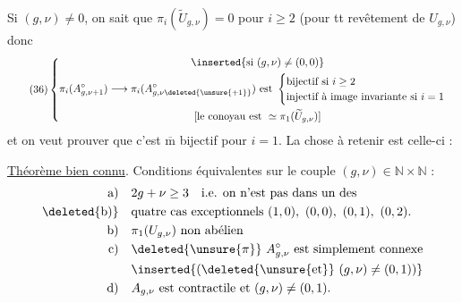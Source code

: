Si $(g,\nu)\ne0$, on sait que $\pi_i(\widetilde U_{g,\nu})=0$ pour $i\geq2$ (pour tt revêtement de $U_{g,\nu}$) donc
\[
\tag{36}
\left\{\begin{gathered}
\inserted{\text{si }(g,\nu)\ne(0,0)}\\
\pi_i(A_{g,\nu+1}^{\circ})\longrightarrow\pi_i(A_{g,\nu\deleted{\unsure{+1}}}^{\circ})
\text{ est }\begin{cases}
\text{bijectif si }i\geq2\\
\text{injectif à image invariante si }i=1
\end{cases}\\
\text{[le conoyau est }\simeq\pi_1(\widetilde U_{g,\nu})\text{]}
\end{gathered}\right.
\]
et on veut prouver que c'est $\overline{\mathrm m}$ bijectif pour $i=1$. La chose à retenir  est celle-ci :


\uline{Théorème bien connu}. Conditions équivalentes sur le couple $(g,\nu)\in\mathbb N\times\mathbb N$ :
\[
\begin{aligned}
\text{a)}\quad &2g+\nu\geq3\quad\text{i.e. on n'est pas dans un des}\\
\text{\deleted{b)}}\quad &\text{quatre cas exceptionnels }(1,0),\ (0,0),\ (0,1),\ (0,2).\\
\text{b)}\quad &\pi_1(U_{g,\nu})\text{ non abélien}\\
\text{c)}\quad &\deleted{\unsure{\pi}}\ A_{g,\nu}^{\circ}\text{ est simplement connexe}\\
&\inserted{\text{(}\deleted{\unsure{\text{et}}}\ (g,\nu)\ne(0,1)\text{)}}\\
\text{d)}\quad &A_{g,\nu}\text{ est contractile et }(g,\nu)\ne(0,1).
\end{aligned}
\]

